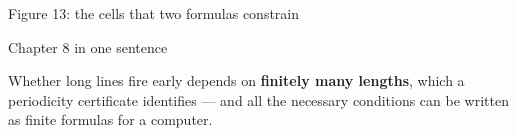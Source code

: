 \begin{frame}{Figure 13: the cells that two formulas constrain}
\centering\fig[0.78]{}
\end{frame}

\begin{frame}{Chapter 8 in one sentence}
\vspace{4ex}
\begin{plainbox}\large
Whether long lines fire early depends on \textbf{finitely many lengths}, which a periodicity certificate identifies --- and all the necessary conditions can be written as finite formulas for a computer.
\end{plainbox}
\end{frame}
